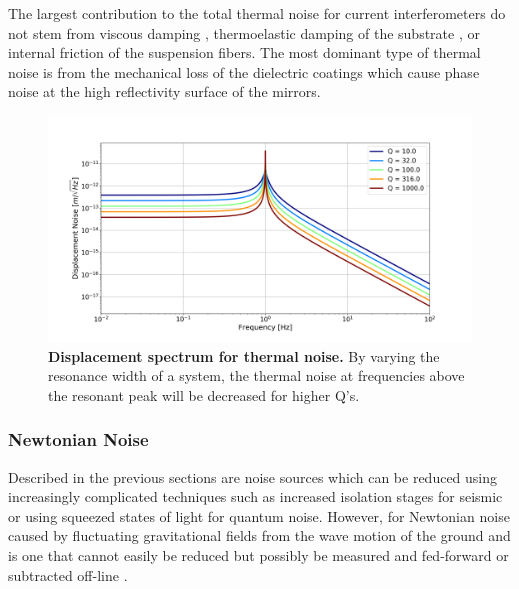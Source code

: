 		The largest contribution to the total thermal noise for current interferometers do not stem from viscous damping \cite{SaulsonThermalNoise}, thermoelastic damping of the substrate \cite{Saulson}, or internal friction of the suspension fibers.  The most dominant type of thermal noise is from the mechanical loss of the dielectric coatings \cite{HarryThermalCoat} \cite{EvansBallmerThermalOptic} which cause phase noise at the high reflectivity surface of the mirrors.
		
		\begin{figure}[ht]
			\centering
			\includegraphics[width=.9 \textwidth]{../Figures/ThermalNoise_ASD.png}
			\caption[Displacement spectrum for thermal noise.]  
			{\textbf{Displacement spectrum for thermal noise.} By varying the resonance width of a system, the thermal noise at frequencies above the resonant peak will be decreased for higher Q's.}
			\label{fig:ThermalNoise}
		\end{figure}
		
		\subsubsection{Newtonian Noise}
		Described in the previous sections are noise sources which can be reduced using increasingly complicated techniques such as increased isolation stages for seismic or using squeezed states of light for quantum noise.  However, for Newtonian noise caused by fluctuating gravitational fields from the wave motion of the ground \cite{SaulsonNewtonian} and \cite{ThorneNewtonian} is one that cannot easily be reduced but possibly be measured and fed-forward or subtracted off-line \cite{DriggersNewtonian}.

